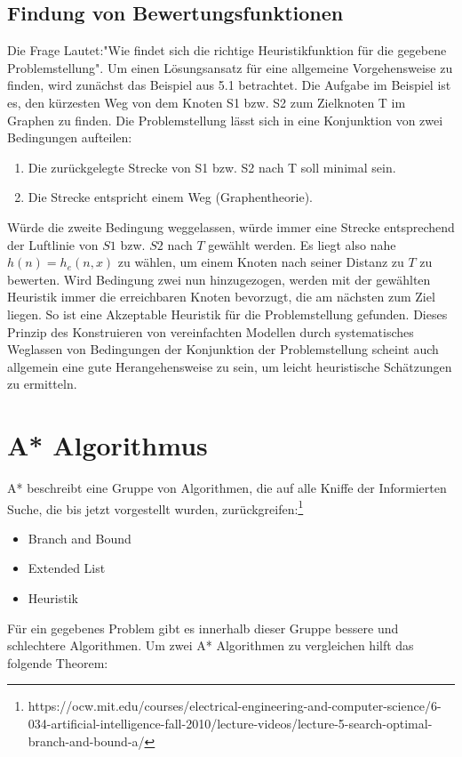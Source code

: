 \subsection{Findung von Bewertungsfunktionen}
Die Frage Lautet:"Wie findet sich die richtige Heuristikfunktion f\"ur die gegebene Problemstellung". Um einen L\"osungsansatz f\"ur eine allgemeine Vorgehensweise zu finden, wird zun\"achst das Beispiel aus 5.1 betrachtet. Die Aufgabe im Beispiel ist es, den k\"urzesten Weg von dem Knoten S1 bzw. S2 zum Zielknoten T im Graphen zu finden. Die Problemstellung l\"asst sich in eine Konjunktion von zwei Bedingungen aufteilen:
\begin{enumerate}
	\item Die zur\"uckgelegte Strecke von S1 bzw. S2 nach T soll minimal sein.
	\item Die Strecke entspricht einem Weg (Graphentheorie).
\end{enumerate}
W\"urde die zweite Bedingung weggelassen, w\"urde immer eine Strecke entsprechend der Luftlinie von $S1$ bzw. $S2$ nach $T$ gew\"ahlt werden. Es liegt also nahe $h(n)=h_{e}(n,x)$ zu w\"ahlen, um einem Knoten nach seiner Distanz zu $T$ zu bewerten. Wird Bedingung zwei nun hinzugezogen, werden mit der gew\"ahlten Heuristik immer die erreichbaren Knoten bevorzugt, die am n\"achsten zum Ziel liegen. So ist eine Akzeptable Heuristik f\"ur die Problemstellung gefunden. Dieses Prinzip des Konstruieren von vereinfachten Modellen durch systematisches Weglassen von Bedingungen der Konjunktion der Problemstellung scheint auch allgemein eine gute Herangehensweise zu sein, um leicht heuristische Sch\"atzungen zu ermitteln.

\section{A* Algorithmus}
A* beschreibt eine Gruppe von Algorithmen, die auf alle Kniffe der Informierten Suche, die bis jetzt vorgestellt wurden, zur\"uckgreifen:\footnote{https://ocw.mit.edu/courses/electrical-engineering-and-computer-science/6-034-artificial-intelligence-fall-2010/lecture-videos/lecture-5-search-optimal-branch-and-bound-a/}
\begin{itemize}
	\item Branch and Bound
	\item Extended List
	\item Heuristik
\end{itemize}
F\"ur ein gegebenes Problem gibt es innerhalb dieser Gruppe bessere und schlechtere Algorithmen. Um zwei A* Algorithmen zu vergleichen hilft das folgende Theorem: 


